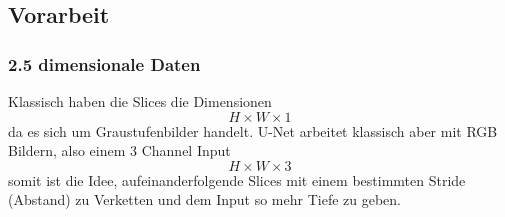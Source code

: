\begin{table}[H]
 \begin{center}
   \caption{Metadaten von dreier Teilstücke}\label{tabelle_meta_daten}
 \end{center}
\end{table}


\subsection{Vorarbeit}

\subsubsection{2.5 dimensionale Daten} \label{ssec:semi3d-data}

Klassisch haben die Slices die Dimensionen 
\begin{equation}
H \times W \times 1
\end{equation}
da es sich um Graustufenbilder handelt. U-Net arbeitet klassisch aber mit RGB Bildern, also einem 3 Channel Input
\begin{equation}
H \times W \times 3
\end{equation}
somit ist die Idee, aufeinanderfolgende Slices mit einem bestimmten Stride (Abstand) zu Verketten und dem Input so mehr Tiefe zu geben.

